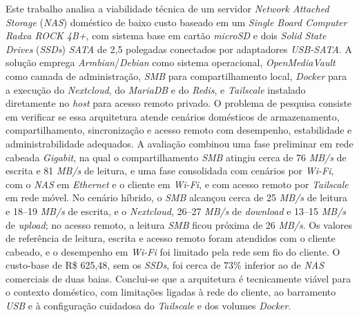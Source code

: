 
\begin{resumo}
    Este trabalho analisa a viabilidade técnica de um servidor \textit{Network Attached Storage} (\textit{NAS}) doméstico de baixo custo baseado em um \textit{Single Board Computer} \textit{Radxa ROCK 4B+}, com sistema base em cartão \textit{microSD} e dois \textit{Solid State Drives} (\textit{SSDs}) \textit{SATA} de 2,5 polegadas conectados por adaptadores \textit{USB-SATA}. A solução emprega \textit{Armbian}/\textit{Debian} como sistema operacional, \textit{OpenMediaVault} como camada de administração, \textit{SMB} para compartilhamento local, \textit{Docker} para a execução do \textit{Nextcloud}, do \textit{MariaDB} e do \textit{Redis}, e \textit{Tailscale} instalado diretamente no \textit{host} para acesso remoto privado. O problema de pesquisa consiste em verificar se essa arquitetura atende cenários domésticos de armazenamento, compartilhamento, sincronização e acesso remoto com desempenho, estabilidade e administrabilidade adequados. A avaliação combinou uma fase preliminar em rede cabeada \textit{Gigabit}, na qual o compartilhamento \textit{SMB} atingiu cerca de 76 \textit{MB/s} de escrita e 81 \textit{MB/s} de leitura, e uma fase consolidada com cenários por \textit{Wi-Fi}, com o \textit{NAS} em \textit{Ethernet} e o cliente em \textit{Wi-Fi}, e com acesso remoto por \textit{Tailscale} em rede móvel. No cenário híbrido, o \textit{SMB} alcançou cerca de 25 \textit{MB/s} de leitura e 18--19 \textit{MB/s} de escrita, e o \textit{Nextcloud}, 26--27 \textit{MB/s} de \textit{download} e 13--15 \textit{MB/s} de \textit{upload}; no acesso remoto, a leitura \textit{SMB} ficou próxima de 26 \textit{MB/s}. Os valores de referência de leitura, escrita e acesso remoto foram atendidos com o cliente cabeado, e o desempenho em \textit{Wi-Fi} foi limitado pela rede sem fio do cliente. O custo-base de R\$ 625,48, sem os \textit{SSDs}, foi cerca de 73\% inferior ao de \textit{NAS} comerciais de duas baias. Conclui-se que a arquitetura é tecnicamente viável para o contexto doméstico, com limitações ligadas à rede do cliente, ao barramento \textit{USB} e à configuração cuidadosa do \textit{Tailscale} e dos volumes \textit{Docker}.

\end{resumo}
